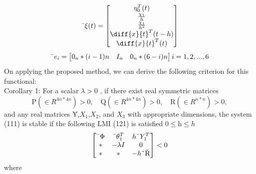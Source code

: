 \documentclass[journal]{IEEEtran}
\begin{document}
\begin{equation}
\text{\={$\xi(t)$}} = 
\begin{bmatrix}
\eta^{T}_{0}(t) \\ 
 \frac{\chi_1}{h} \\ 
 \frac{\chi_1}{h^2} \\
\diff{x}{t}^T(t - h) \\
\diff{x}{t}^T(t) \\
\end{bmatrix}
\end{equation}
\begin{equation}
\text{\={$e_i$}} = 
\begin{bmatrix}
0_n*(i-1)n & I_n & 0_n*(6-i)n  
\end{bmatrix}
i=1,2,...,6
\end{equation}
On applying the proposed method, we can derive the following criterion for this functional: 
\\
Corollary 1:
For a scalar $\lambda > 0$ , if there exist real symmetric matrices
\begin{equation}
\text{\={P}} (\text{$\in {R^{4n*4n}}$}) > 0, \quad  \text{\={Q}}(\text{$\in {R^{4n*4n}}$}) > 0, \quad \text{\={R}} (\text{$\in {R^{n*n}}$}) > 0,
\end{equation}
and any real matrices {\={Y}},{\={$X_1$}},{\={$X_2$}}, and {\={$X_3$}}
with appropriate dimensions, the system (111) is stable if the following LMI (121) is satisfied $0\leqslant\text{\={h}}\leqslant h$
\begin{equation}
\begin{bmatrix}
\text{\={$\Phi$}} & \text{\={$\theta^{T}_{1}$}} & h\text{\={$Y^{T}_{1}$}} \\
* & -\lambda I   & 0 \\
* & * & -h\text{\~{\={R}}}
\end{bmatrix}
< 0
\end{equation}
where 
\end{document}
